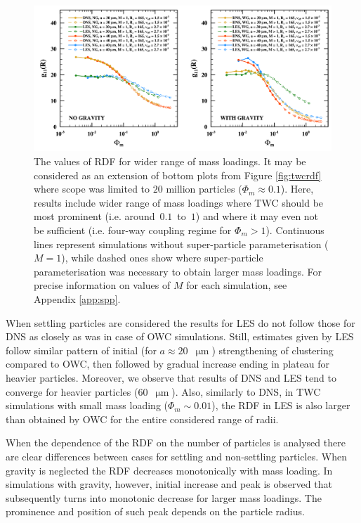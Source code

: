 \documentclass{pracamgren}
\begin{document}
\begin{figure}[ht]
\centering
\includegraphics[width=13.5cm]{figures/2-09_twcrdfext.pdf}
\caption{
The values of RDF for wider range of mass loadings.
It may be considered as an extension of bottom plots from Figure \ref{fig:twcrdf} where scope was limited to $20$ million particles (${\Phi_m \approx 0.1}$).
Here, results include wider range of mass loadings where TWC should be most prominent (i.e. around~$0.1$~to~$1$) and where it may even not be sufficient (i.e. four-way coupling regime for $\Phi_m > 1$).
Continuous lines represent simulations without super-particle parameterisation ($M=1$), while dashed ones show where super-particle parameterisation was necessary to obtain larger mass loadings.
For precise information on values of $M$ for each simulation, see Appendix \ref{app:spp}. 
}
\label{fig:twcrdfext}
\end{figure}


When settling particles are considered the results for LES do not follow those for DNS as closely as was in case of OWC simulations.
Still, estimates given by LES follow similar pattern of initial (for $a \approx 20$~$\upmu\text{m}$) strengthening of clustering compared to OWC, then followed by gradual increase ending in plateau for heavier particles.
Moreover, we observe that results of DNS and LES tend to converge for heavier particles ($60$~$\upmu\text{m}$).
Also, similarly to DNS, in TWC simulations with small mass loading ($\Phi_m \sim 0.01$), the RDF in LES is also larger than obtained by OWC for the entire considered range of radii.

When the dependence of the RDF on the number of particles is analysed there are clear differences between cases for settling and non-settling particles.
When gravity is neglected the RDF decreases monotonically with mass loading.
In simulations with gravity, however, initial increase and peak is observed that subsequently turns into monotonic decrease for larger mass loadings.
The prominence and position of such peak depends on the particle radius.
\end{document}
